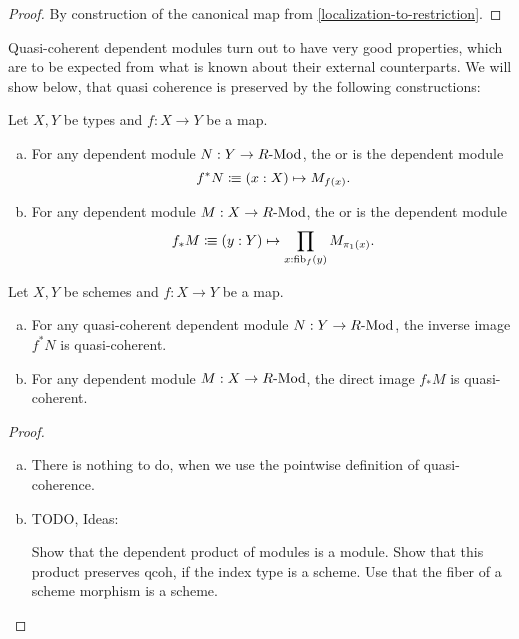 \begin{proof}
  By construction of the canonical map from \cref{localization-to-restriction}.
\end{proof}

Quasi-coherent dependent modules turn out to have very good properties,
which are to be expected from what is known about their external counterparts.
We will show below, that quasi coherence is preserved by the following constructions:

\begin{definition}
  \label{pullback-push-forward}
  Let $X,Y$ be types and $f:X\to Y$ be a map.
  \begin{enumerate}[(a)]
  \item {} For any dependent module $N:Y\to R\text{-}\mathrm{Mod}$,
    the  or  is the dependent module
    \[
      f^*N\colonequiv (x:X) \mapsto M_{f(x)}\rlap{.}
    \]
  \item {} For any dependent module $M:X\to R\text{-}\mathrm{Mod}$,
    the  or  is the dependent module
    \[
      f_*M\colonequiv (y:Y) \mapsto \prod_{x:\fib_f(y)}M_{\pi_1(x)}\rlap{.}
    \]
  \end{enumerate}
\end{definition}

\begin{theorem}%
  \label{pullback-push-forward-qcoh}
  Let $X,Y$ be schemes and $f:X\to Y$ be a map.
  \begin{enumerate}[(a)]
  \item For any quasi-coherent dependent module $N:Y\to R\text{-}\mathrm{Mod}$,
    the inverse image $f^*N$ is quasi-coherent.
  \item For any dependent module $M:X\to R\text{-}\mathrm{Mod}$,
    the direct image $f_*M$ is quasi-coherent.
  \end{enumerate}
\end{theorem}

\begin{proof}
  \begin{enumerate}[(a)]
  \item There is nothing to do, when we use the pointwise definition of quasi-coherence. 
  \item TODO, Ideas:

    Show that the dependent product of modules is a module.
    Show that this product preserves qcoh, if the index type is a scheme.
    Use that the fiber of a scheme morphism is a scheme.
  \end{enumerate}
\end{proof}

